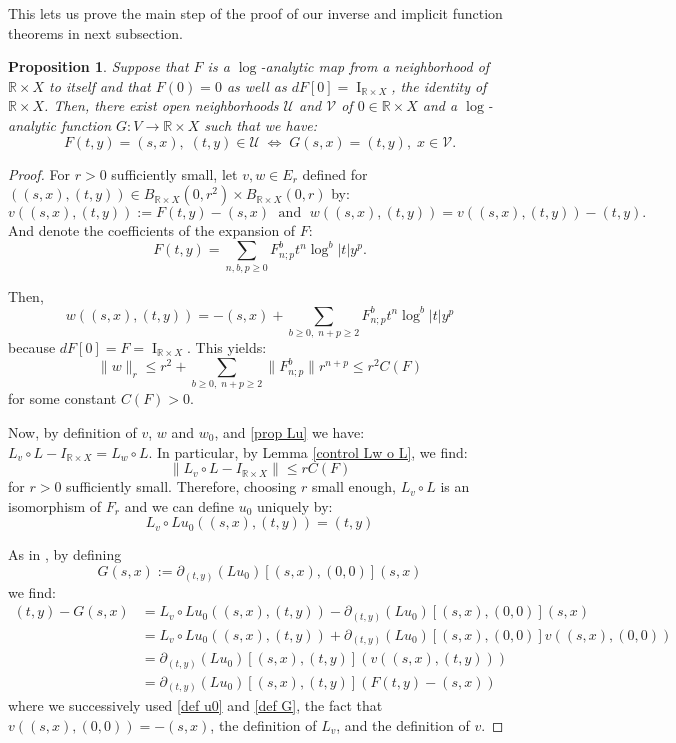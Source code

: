 \documentclass[12pt]{article}
\newtheorem{prop}[thm]{Proposition}
\begin{document}
    This lets us prove the main step of the proof of our inverse and implicit function theorems in next subsection.
    \begin{prop}
        Suppose that $F$ is a $\log$-analytic map from a neighborhood of ${\mathbb{R}\times X}$ to itself and that $F(0)=0$ as well as $dF[0] = \operatorname{I}_{\mathbb{R}\times X}$, the identity of ${\mathbb{R}\times X}$. Then, there exist open neighborhoods $\mathcal{U}$ and $\mathcal{V}$ of $0\in {\mathbb{R}\times X}$ and a $\log$-analytic function $G : V\to {\mathbb{R}\times X}$ such that we have:
        $$ F(t,y) = (s,x),\; (t,y)\in \mathcal{U}\; \iff\; G(s,x) = (t,y),\; x\in \mathcal{V}. $$
    \end{prop}
    \begin{proof}
        For $r>0$ sufficiently small, let $v,w\in E_r$ defined for $((s,x),(t,y))\in B_{\mathbb{R}\times X}(0,r^2)\times B_{\mathbb{R}\times X}(0,r)$ by:
        $$v((s,x),(t,y)):=F(t,y)-(s,x)\; \text{ and }\; w((s,x),(t,y)) = v((s,x),(t,y))-(t,y).$$
        And denote the coefficients of the expansion of $F$:
        $$F(t,y) = \sum_{n,b,p\geqslant 0} F^b_{n;p} t^n\log^b|t| y^p. $$
        
        Then, 
        $$ w((s,x),(t,y)) = -(s,x) + \sum_{b \geqslant 0,\;n+p\geqslant 2} F_{n;p}^bt^n\log^b|t| y^p $$
        because $dF[0] = F = \operatorname{I}_{\mathbb{R}\times X}$. This yields:
        $$ \|w\|_r \leqslant r^2 + \sum_{b \geqslant 0,\;n+p\geqslant 2} \|F_{n;p}^b\|r^{n+p}\leqslant r^2 C(F) $$
        for some constant $C(F)>0$. 
        
        Now, by definition of $v$, $w$ and $w_0$, and \eqref{prop Lu} we have:
        $ L_v\circ L-I_{\mathbb{R}\times X} = L_w\circ L. $
        In particular, by Lemma \ref{control Lw o L}, we find:
        $$\|L_v\circ L-I_{\mathbb{R}\times X}\|\leqslant r C(F)$$
        for $r>0$ sufficiently small. Therefore, choosing $r$ small enough, $L_v\circ L$ is an isomorphism of $F_r$ and we can define $u_0$ uniquely by:
        \begin{equation}
            L_v \circ Lu_0 ((s,x),(t,y)) = (t,y)\label{def u0}
        \end{equation}
        
        As in \cite{bt}, by defining
        \begin{equation}
            G(s,x):= \partial_{(t,y)}(Lu_0)[(s,x),(0,0)](s,x)\label{def G}
        \end{equation}
        we find:
        \begin{align*}
            (t,y) - G(s,x) &=L_v \circ Lu_0 ((s,x),(t,y)) -\partial_{(t,y)}(Lu_0)[(s,x),(0,0)](s,x)\\
            &= L_v \circ Lu_0 ((s,x),(t,y)) +\partial_{(t,y)}(Lu_0)[(s,x),(0,0)]v((s,x),(0,0))\\
            &=\partial_{(t,y)}(L u_0)[(s,x),(t,y)] (v((s,x),(t,y)))\\
            &=\partial_{(t,y)}(L u_0)[(s,x),(t,y)] (F(t,y)-(s,x))
        \end{align*}
        where we successively used \eqref{def u0} and \eqref{def G}, the fact that $v((s,x),(0,0)) = -(s,x)$, the definition of $L_v$, and the definition of $v$.
        

\end{proof}
\end{document}
